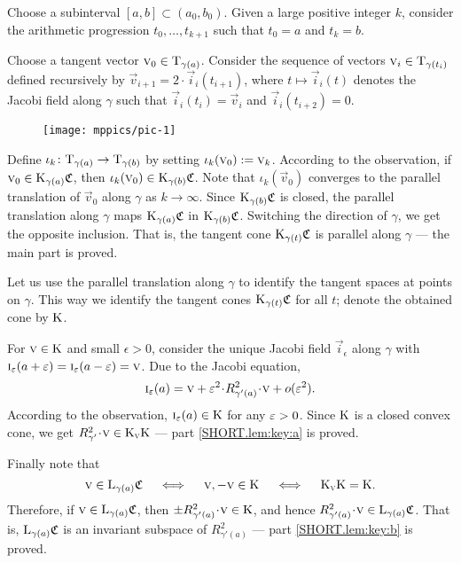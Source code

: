 \documentclass[a4paper,10pt]{article}
\begin{document}
Choose a subinterval $[a,b] \subset (a_0,b_0)$.
Given a large positive integer $k$, consider the arithmetic progression
$t_0,\dots,t_{k+1}$ such that $t_0=a$ and $t_k=b$.

Choose a tangent vector $\text{\sc{v}}_0\in\mathrm{T}_{\gamma(a)}$.
Consider the sequence of vectors $\vec{v}_i\z\in\T_{\gamma(t_i)}$ defined recursively by $\vec{v}_{i+1}=2\cdot \vec i_i(t_{i+1})$, where $t\mapsto \vec i_i(t)$ denotes the Jacobi field along $\gamma$ such that $\vec i_i(t_i)=\vec{v}_i$ and $\vec i_i(t_{i+2})=0$.

\begin{figure}[ht!]
\vskip-0mm
\centering
\texttt{[image: mppics/pic-1]}
\end{figure}

Define $\iota_k\colon\mathrm{T}_{\gamma(a)}\to \mathrm{T}_{\gamma(b)}$ by setting $\iota_k(\text{\sc{v}}_0)\mathrel{{:}{=}} \text{\sc{v}}_k$.
According to the observation, if $\text{\sc{v}}_0\in \mathrm{K}_{\gamma(a)}\mathfrak{C}$, then $\iota_k(\text{\sc{v}}_0)\in \mathrm{K}_{\gamma(b)}\mathfrak{C}$.
Note that $\iota_k(\vec v_0)$ converges to the parallel translation of $\vec v_0$ along $\gamma$ as $k\to \infty$.
Since $\mathrm{K}_{\gamma(b)}\mathfrak{C}$ is closed,
the parallel translation along $\gamma$ maps $\mathrm{K}_{\gamma(a)}\mathfrak{C}$ in $\mathrm{K}_{\gamma(b)}\mathfrak{C}$.
Switching the direction of $\gamma$, we get the opposite inclusion.
That is, the tangent cone $\mathrm{K}_{\gamma(t)}\mathfrak{C}$ is parallel along $\gamma$ --- the main part is proved.

Let us use the parallel translation along $\gamma$ to identify the tangent spaces at points on $\gamma$.
This way we identify the tangent cones $\mathrm{K}_{\gamma(t)}\mathfrak{C}$ for all $t$;
denote the obtained cone by $\mathrm{K}$.

For $\text{\sc{v}}\in \mathrm{K}$ and small $\epsilon>0$, consider the unique Jacobi field $\vec i_\epsilon$ along $\gamma$ with $\vec i_\epsilon (a+\eps)\z=\vec i _\epsilon(a-\eps)=\vec{v}$.
Due to the Jacobi equation,
\[\vec i_\epsilon (a)=\vec{v} +\eps^2\cdot R^2_{\gamma'(a)}\cdot \vec{v} +o(\eps^2).\]
According to the observation, $\text{\sc{i}}_\varepsilon(a)\in \mathrm{K}$ for any $\varepsilon>0$.
Since $\mathrm{K}$ is a closed convex cone, we get $R^2_{\gamma'}\cdot \vec{v}\z\in \K_\vec{v}\K$ --- part \ref{SHORT.lem:key:a} is proved.

Finally note that 
\[\text{\sc{v}}\in \mathrm{L}_{\gamma(a)}\mathfrak{C}
\quad\iff\quad 
\text{\sc{v}}, -\text{\sc{v}}\in \mathrm{K}
\quad\iff\quad 
\mathrm{K}_{\text{\sc{v}}}\mathrm{K}=\mathrm{K}.
\]
Therefore, if $\text{\sc{v}}\in \mathrm{L}_{\gamma(a)}\mathfrak{C}$, then $\pm R^2_{\gamma'(a)}\cdot \vec{v}\in \K$, and hence $R^2_{\gamma'(a)}\cdot \vec{v}\in \L_{\gamma(a)}\mathfrak{C}$.
That is, $\mathrm{L}_{\gamma(a)}\mathfrak{C}$ is an invariant subspace of $R^2_{\gamma'(a)}$ --- part \ref{SHORT.lem:key:b} is proved.
\qeds
\end{document}
